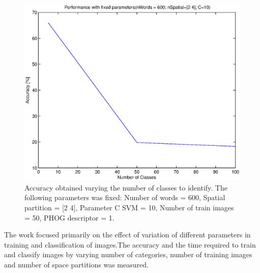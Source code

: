 \documentclass[10pt,twocolumn,letterpaper]{article}
\begin{document}
\begin{figure}[h]
\begin{center}
\includegraphics[width=1\linewidth]{images/nClass1.eps}
\end{center}
   \caption{
Accuracy obtained varying the number of classes to identify. The following parameters was fixed: Number of words = 600, Spatial partition = [2 4], Parameter C SVM = 10, Number of train images = 50, PHOG descriptor = 1.
   }
\label{nClass1}
\end{figure}

The work focused primarily on the effect of variation of different parameters in training and classification of images.The accuracy and the time required to train and classify images by varying number of categories, number of training images and number of space partitions was measured.
\end{document}
